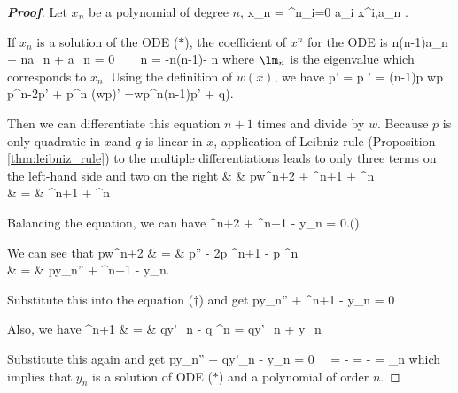 \begin{proof}[\bf Proof]
Let $x_n$ be a polynomial of degree $n$,
\be
x_n = \sum^n_{i=0} a_i x^i,\quad a_n .
\ee

If $x_n$ is a solution of the ODE ($*$), the coefficient of $x^n$ for the ODE is
\be
n(n-1)\alpha a_n + n\mu a_n + \lm a_n = 0 \ \ra\ \lm_n = -n(n-1)\alpha - n\mu
\ee
where $\lm_n$ is the eigenvalue which corresponds to $x_n$. %
%
Using the definition of $w(x)$, we have
\be
p' = p ' = (n-1)p wp p^{n-2}p' + p^n (wp)' =wp^n(n-1)p' + q). %
\ee

Then we can differentiate this equation $n+1$ times and divide by $w$. Because $p$ is only quadratic in $x$and $q$ is linear in $x$, application of Leibniz rule (Proposition \ref{thm:leibniz_rule}) to the multiple differentiations leads to only three terms on the left-hand side and two on the right
\beast
& & \frac pw^{n+2} +   ^{n+1} + ^{n}\\
& = & ^{n+1} + ^{n}
\eeast

Balancing the equation, we can have
\be
{} ^{n+2} +  ^{n+1} - y_n = 0.\qquad (\dag)
\ee

We can see that
\beast
\frac pw^{n+2} & = & p'' - 2p  ^{n+1} - p ^{n} \\
& = & py_n'' + ^{n+1} - y_n.
\eeast

Substitute this into the equation ($\dag$) and get
\be
py_n'' + ^{n+1} - y_n = 0
\ee

Also, we have
\beast
{}^{n+1} & = & qy'_n - q ^{n} = qy'_n + y_n
\eeast

Substitute this again and get
\be
py_n'' + qy'_n - y_n = 0 \ \ra\ \lm = -  = -  = \lm_n
\ee
which implies that $y_n$ is a solution of ODE ($*$) and a polynomial of order $n$.
\end{proof}



